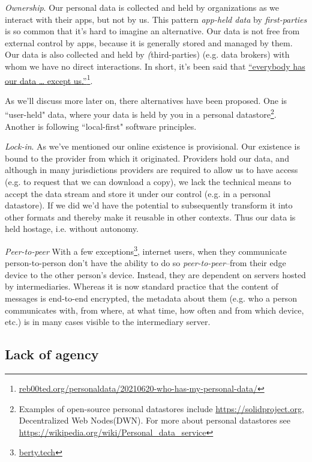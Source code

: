 \documentclass[11pt, oneside]{article}   	%
\newcommand{\hyperfootnote}[1][]{\def\ArgI{{#1}}\hyperfootnoteRelay}
\newcommand\hyperfootnoteRelay[2][]{\href{#1#2}{\ArgI}\footnote{\href{#1#2}{#2}}}
\begin{document}
\emph{Ownership}. Our personal data is collected and held by organizations as we interact with their apps, but not by us. This pattern \emph{app-held data} by \emph{first-parties} is so common that it's hard to imagine an alternative. Our data is not free from external control by apps, because it is generally stored and managed by them. Our data is also collected and held by \emph(third-parties) (e.g. data brokers) with whom we have no direct interactions. In short, it's been said that \hyperfootnote[“everybody has our data … except us.”][https://]{reb00ted.org/personaldata/20210620-who-has-my-personal-data/}. 

As we'll discuss more later on, there alternatives have been proposed. One is ``user-held" data\cite{Jurcys2021}, where your data is held by you in a personal datastore\footnote{Examples of open-source personal datastores include \url{https://solidproject.org}, Decentralized Web Nodes(DWN). For more about personal datastores see \url{https://wikipedia.org/wiki/Personal\_data\_service}}. Another is following ``local-first" software principles.\cite{Kleppmann2019}

\emph{Lock-in}. As we've mentioned our online existence is provisional. Our existence is bound to the provider from which it originated. Providers hold our data, and although in many jurisdictions providers are required to allow us to have access (e.g. to request that we can download a copy), we lack the technical means to accept the data stream and store it under our control (e.g. in a personal datastore). If we did we'd have the potential to subsequently transform it into other formats and thereby make it reusable in other contexts. Thus our data is held hostage, i.e. without autonomy. 

\emph{Peer-to-peer} With a few exceptions\hyperfootnote[][https://]{berty.tech}, internet users, when they communicate person-to-person don't have the ability to do so \emph{peer-to-peer}--from their edge device to the other person's device. Instead, they are dependent on servers hosted by intermediaries. Whereas it is now standard practice that the content of messages is end-to-end encrypted, the metadata about them (e.g. who a person communicates with, from where, at what time, how often and from which device, etc.) is in many cases visible to the intermediary server. 

\subsection{Lack of agency}
\end{document}

